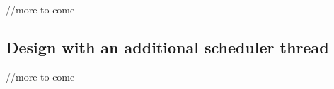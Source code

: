 \documentclass[11pt]{article}
\newcommand{\spacelayer}[3]{node (#1) [practica]
  {#2\\{\scriptsize\textit{#3}}}}
\newcommand{\background}[5]{%
  \begin{pgfonlayer}{background}
    \path (#1.west |- #2.north)+(-0.5,0.5) node (a1) {};
    \path (#3.east |- #4.south)+(+0.5,-0.25) node (a2) {};
    \path[fill=yellow!20,rounded corners, draw=black!50, dashed]
      (a1) rectangle (a2);
    \path (a1.east |- a1.south)+(0.8,-0.3) node (u1)[texto]
      {\scriptsize\textit{#5}};
  \end{pgfonlayer}}
\begin{document}
//more to come

\subsection*{Design with an additional scheduler thread}
//more to come

%
% 
%  
%
%
%  
%  
%
%
%
%  
\end{document}
